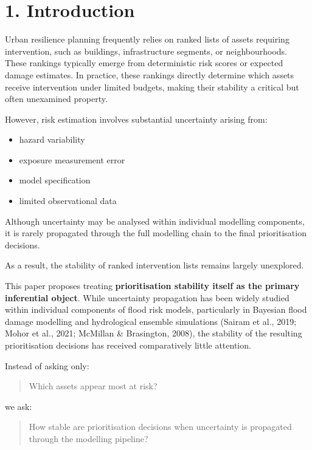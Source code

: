 \documentclass[
]{article}
\providecommand{\tightlist}{%
  \setlength{\itemsep}{0pt}\setlength{\parskip}{0pt}}
\begin{document}
\section{1. Introduction}\label{introduction}

Urban resilience planning frequently relies on ranked lists of assets
requiring intervention, such as buildings, infrastructure segments, or
neighbourhoods. These rankings typically emerge from deterministic risk
scores or expected damage estimates. In practice, these rankings
directly determine which assets receive intervention under limited
budgets, making their stability a critical but often unexamined
property.

However, risk estimation involves substantial uncertainty arising from:

\begin{itemize}
\tightlist
\item
  hazard variability
\item
  exposure measurement error
\item
  model specification
\item
  limited observational data
\end{itemize}

Although uncertainty may be analysed within individual modelling
components, it is rarely propagated through the full modelling chain to
the final prioritisation decisions.

As a result, the stability of ranked intervention lists remains largely
unexplored.

This paper proposes treating \textbf{prioritisation stability itself as
the primary inferential object}. While uncertainty propagation has been
widely studied within individual components of flood risk models,
particularly in Bayesian flood damage modelling and hydrological
ensemble simulations (Sairam et al., 2019; Mohor et al., 2021; McMillan
\& Brasington, 2008), the stability of the resulting prioritisation
decisions has received comparatively little attention.

Instead of asking only:

\begin{quote}
Which assets appear most at risk?
\end{quote}

we ask:

\begin{quote}
How stable are prioritisation decisions when uncertainty is propagated
through the modelling pipeline?
\end{quote}
\end{document}
